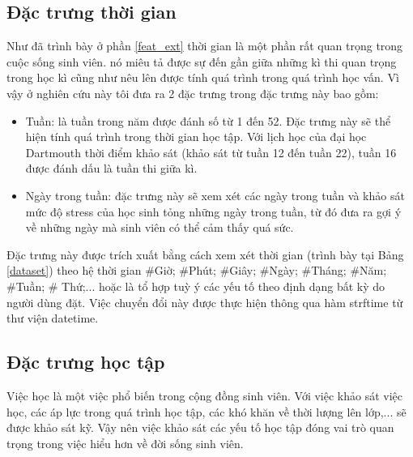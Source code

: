 \subsection{Đặc trưng thời gian}
Như đã trình bày ở phần \ref{feat_ext} thời gian là một phần rất quan trọng trong cuộc sống sinh viên. nó miêu tả được sự đến gần giữa những kì thi quan trọng trong học kì cũng như nêu lên được tính quá trình trong quá trình học vấn. Vì vậy ở nghiên cứu này tôi đưa ra 2 đặc trưng trong đặc trưng này bao gồm:
\begin{itemize}
    \item Tuần: là tuần trong năm được đánh số từ 1 đến 52. Đặc trưng này sẽ thể hiện tính quá trình trong thời gian học tập. Với lịch học của đại học Dartmouth thời điểm khảo sát (khảo sát từ tuần 12 đến tuần 22), tuần 16 được đánh dấu là tuần thi giữa kì.
    \item Ngày trong tuần: đặc trưng này sẽ xem xét các ngày trong tuần và khảo sát mức độ stress của học sinh tỏng những ngày trong tuần, từ đó đưa ra gợi ý về những ngày mà sinh viên có thể cảm thấy quá sức.
\end{itemize}

Đặc trưng này được trích xuất bằng cách xem xét thời gian (trình bày tại Bảng \ref{dataset}) theo hệ thời gian \#Giờ; \#Phút; \#Giây; \#Ngày; \#Tháng; \#Năm; \#Tuần; \# Thứ;... hoặc là tổ hợp tuỳ ý các yếu tố theo định dạng bất kỳ do người dùng đặt. Việc chuyển đổi này được thực hiện thông qua hàm strftime từ thư viện datetime\cite{datetime_lib}. 


\subsection{Đặc trưng học tập}
Việc học là một việc phổ biến trong cộng đồng sinh viên. Với việc khảo sát việc học, các áp lực trong quá trình học tập, các khó khăn về thời lượng lên lớp,... sẽ được khảo sát kỹ. Vậy nên việc khảo sát các yếu tố học tập đóng vai trò quan trọng trong việc hiểu hơn về đời sống sinh viên.
